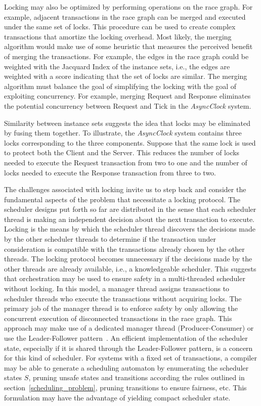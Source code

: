 Locking may also be optimized by performing operations on the race graph.
For example, adjacent transactions in the race graph can be merged and executed under the same set of locks.
This procedure can be used to create complex transactions that amortize the locking overhead.
Most likely, the merging algorithm would make use of some heuristic that measures the perceived benefit of merging the transactions.
For example, the edges in the race graph could be weighted with the Jacquard Index of the instance sets, i.e., the edges are weighted with a score indicating that the set of locks are similar.
The merging algorithm must balance the goal of simplifying the locking with the goal of exploiting concurrency.
For example, merging Request and Response eliminates the potential concurrency between Request and Tick in the \emph{AsyncClock} system.

Similarity between instance sets suggests the idea that locks may be eliminated by fusing them together.
To illustrate, the \emph{AsyncClock} system contains three locks corresponding to the three components.
Suppose that the same lock is used to protect both the Client and the Server.
This reduces the number of locks needed to execute the Request transaction from two to one and the number of locks needed to execute the Response transaction from three to two.

The challenges associated with locking invite us to step back and consider the fundamental aspects of the problem that necessitate a locking protocol.
The scheduler designs put forth so far are distributed in the sense that each scheduler thread is making an independent decision about the next transaction to execute.
Locking is the means by which the scheduler thread discovers the decisions made by the other scheduler threads to determine if the transaction under consideration is compatible with the transactions already chosen by the other threads.
The locking protocol becomes unnecessary if the decisions made by the other threads are already available, i.e., a knowledgeable scheduler.
This suggests that orchestration may be used to ensure safety in a multi-threaded scheduler without locking.
In this model, a manager thread assigns transactions to scheduler threads who execute the transactions without acquiring locks.
The primary job of the manager thread is to enforce safety by only allowing the concurrent execution of disconnected transactions in the race graph.
This approach may make use of a dedicated manager thread (Producer-Consumer) or use the Leader-Follower pattern~\cite{schmidt2000pattern}.
An efficient implementation of the scheduler state, especially if it is shared through the Leader-Follower pattern, is a concern for this kind of scheduler.
For systems with a fixed set of transactions, a compiler may be able to generate a scheduling automaton by enumerating the scheduler states $S$, pruning unsafe states and transitions according the rules outlined in section~\ref{scheduling_problem}, pruning transitions to ensure fairness, etc.
This formulation may have the advantage of yielding compact scheduler state.

